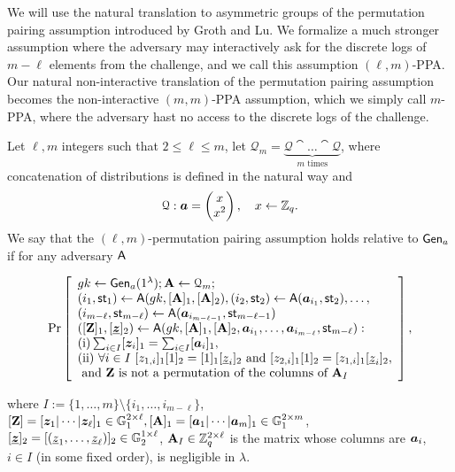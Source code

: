
We will use the natural translation to asymmetric groups of the permutation pairing assumption introduced by Groth and Lu. We formalize a much stronger assumption where the adversary may interactively ask for the discrete logs of $m-\ell$ elements from the challenge, and we call this assumption $(\ell,m)$-PPA.
Our natural non-interactive translation of the permutation pairing assumption becomes the non-interactive $(m,m)$-PPA assumption, which we simply call $m$-PPA, where the adversary hast no access to the discrete logs of the challenge.
\begin{definition}\label{def:ppa}
Let $\ell,m$ integers such that $2\leq \ell \leq m$, let $\mathcal{Q}_{m}=\underbrace{\mathcal{Q}\cat\ldots\cat\mathcal{Q}}_{m\text{ times}}$, where concatenation of  distributions is defined in the natural way and 
$$\mathcal{Q}: {\boldsymbol{a}}=\left(\begin{matrix}x\\x^2\end{matrix}\right),\quad x\gets\mathbb{Z}_q.$$
We say that the $(\ell,m)$-permutation pairing assumption holds relative to $\mathsf{Gen}_a$ if for any adversary $\mathsf{A}$
\begin{small}$$
\Pr\left[
\begin{array}{l}
	gk\gets\mathsf{Gen}_a(1^\lambda);\mathbf{{A}}\gets\mathcal{Q}_{m};\\
	(i_1,\mathsf{st}_1) \gets \mathsf{A}(gk,[\mathbf{{A}}]_1,[\mathbf{{A}}]_2),
	(i_2,\mathsf{st}_2) \gets \mathsf{A}({\boldsymbol{a}}_{i_1},\mathsf{st}_2),\ldots,\\
	(i_{m-\ell},\mathsf{st}_{m-\ell}) \gets \mathsf{A}({\boldsymbol{a}}_{i_{m-\ell-1}},\mathsf{st}_{m-\ell-1})\\
	([\mathbf{{Z}}]_1,[\underline{{\boldsymbol{z}}}]_2)\gets\mathsf{A}(gk,[\mathbf{{A}}]_1,[\mathbf{{A}}]_2, {\boldsymbol{a}}_{i_1},\ldots, {\boldsymbol{a}}_{i_{m-\ell}},\mathsf{st}_{m-\ell}):\\
	\mathrm{(i)} \sum_{i\in I}[{\boldsymbol{z}}_i]_1 = \sum_{i\in I}[{\boldsymbol{a}}_i]_1,\\
	\mathrm{(ii)}\ \forall i\in I \ [z_{1,i}]_1[1]_2=[1]_1[\underline{z}_{i}]_2 \text{ and } [z_{2,i}]_1[1]_2=[z_{1,i}]_1[\underline{z}_{i}]_2,\\
	\text{ and }\mathbf{{Z}}\text{ is not a permutation of the columns of }\mathbf{{A}}_I
\end{array}
\right],
$$\end{small}
where $I:=\{1,\ldots, m\}\setminus \{i_1,\ldots, i_{m-\ell} \}$, $[\mathbf{{Z}}]=[{\boldsymbol{z}}_1|\cdots|{\boldsymbol{z}}_\ell]_1\in\mathbb{G}_1^{2\times \ell}, [\mathbf{{A}}]_1=[{\boldsymbol{a}}_1|\cdots|{\boldsymbol{a}}_m]_1\in\mathbb{G}_1^{2\times m}$, $[\underline{{\boldsymbol{z}}}]_2=\allowbreak[(\underline{z}_1,\ldots,\allowbreak \underline{z}_\ell)]_2\in\mathbb{G}_2^{1\times \ell}$,
$\mathbf{{A}}_I\in \mathbb{Z}_q^{2\times \ell}$ is the matrix whose columns are ${\boldsymbol{a}}_i$, $i\in I$ (in some fixed order),
 is negligible in $\lambda$.
\end{definition}
